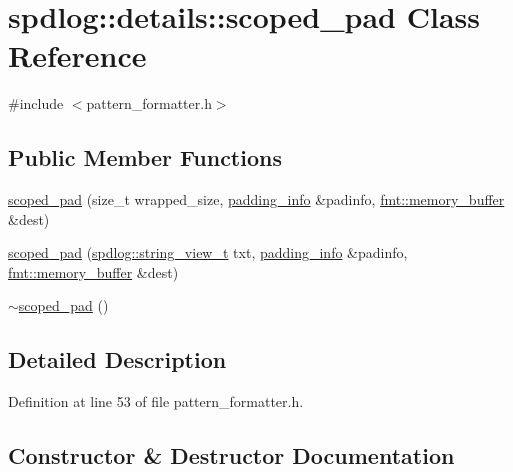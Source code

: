 \hypertarget{classspdlog_1_1details_1_1scoped__pad}{}\section{spdlog\+:\+:details\+:\+:scoped\+\_\+pad Class Reference}
\label{classspdlog_1_1details_1_1scoped__pad}


{\ttfamily \#include $<$pattern\+\_\+formatter.\+h$>$}

\subsection*{Public Member Functions}
\begin{DoxyCompactItemize}
\item 
\hyperlink{classspdlog_1_1details_1_1scoped__pad_a1da16eb464801b04d397174e7338d990}{scoped\+\_\+pad} (size\+\_\+t wrapped\+\_\+size, \hyperlink{structspdlog_1_1details_1_1padding__info}{padding\+\_\+info} \&padinfo, \hyperlink{format_8h_a21cbf729f69302f578e6db21c5e9e0d2}{fmt\+::memory\+\_\+buffer} \&dest)
\item 
\hyperlink{classspdlog_1_1details_1_1scoped__pad_a945477b9e2c1ee236238bb63129a767d}{scoped\+\_\+pad} (\hyperlink{namespacespdlog_af48e310b2f366ac6544701e6a3b56247}{spdlog\+::string\+\_\+view\+\_\+t} txt, \hyperlink{structspdlog_1_1details_1_1padding__info}{padding\+\_\+info} \&padinfo, \hyperlink{format_8h_a21cbf729f69302f578e6db21c5e9e0d2}{fmt\+::memory\+\_\+buffer} \&dest)
\item 
\hyperlink{classspdlog_1_1details_1_1scoped__pad_ad901678fa607829f784cd293f712a112}{$\sim$scoped\+\_\+pad} ()
\end{DoxyCompactItemize}


\subsection{Detailed Description}


Definition at line 53 of file pattern\+\_\+formatter.\+h.



\subsection{Constructor \& Destructor Documentation}
\mbox{\label{classspdlog_1_1details_1_1scoped__pad_a1da16eb464801b04d397174e7338d990}} 
